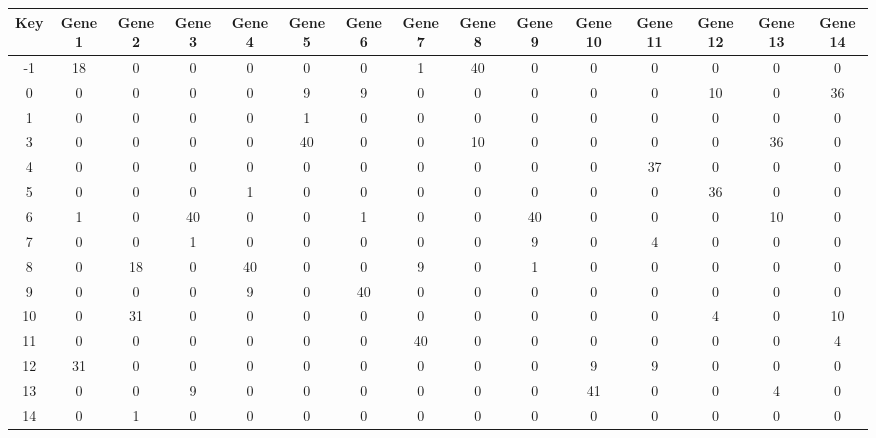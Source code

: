 \begin{tabular}{|c|c|c|c|c|c|c|c|c|c|c|c|c|c|c|}
\hline
Key & Gene 1 & Gene 2 & Gene 3 & Gene 4 & Gene 5 & Gene 6 & Gene 7 & Gene 8 & Gene 9 & Gene 10 & Gene 11 & Gene 12 & Gene 13 & Gene 14 \\
\hline
-1 & 18 & 0 & 0 & 0 & 0 & 0 & 1 & 40 & 0 & 0 & 0 & 0 & 0 & 0 \\
0 & 0 & 0 & 0 & 0 & 9 & 9 & 0 & 0 & 0 & 0 & 0 & 10 & 0 & 36 \\
1 & 0 & 0 & 0 & 0 & 1 & 0 & 0 & 0 & 0 & 0 & 0 & 0 & 0 & 0 \\
3 & 0 & 0 & 0 & 0 & 40 & 0 & 0 & 10 & 0 & 0 & 0 & 0 & 36 & 0 \\
4 & 0 & 0 & 0 & 0 & 0 & 0 & 0 & 0 & 0 & 0 & 37 & 0 & 0 & 0 \\
5 & 0 & 0 & 0 & 1 & 0 & 0 & 0 & 0 & 0 & 0 & 0 & 36 & 0 & 0 \\
6 & 1 & 0 & 40 & 0 & 0 & 1 & 0 & 0 & 40 & 0 & 0 & 0 & 10 & 0 \\
7 & 0 & 0 & 1 & 0 & 0 & 0 & 0 & 0 & 9 & 0 & 4 & 0 & 0 & 0 \\
8 & 0 & 18 & 0 & 40 & 0 & 0 & 9 & 0 & 1 & 0 & 0 & 0 & 0 & 0 \\
9 & 0 & 0 & 0 & 9 & 0 & 40 & 0 & 0 & 0 & 0 & 0 & 0 & 0 & 0 \\
10 & 0 & 31 & 0 & 0 & 0 & 0 & 0 & 0 & 0 & 0 & 0 & 4 & 0 & 10 \\
11 & 0 & 0 & 0 & 0 & 0 & 0 & 40 & 0 & 0 & 0 & 0 & 0 & 0 & 4 \\
12 & 31 & 0 & 0 & 0 & 0 & 0 & 0 & 0 & 0 & 9 & 9 & 0 & 0 & 0 \\
13 & 0 & 0 & 9 & 0 & 0 & 0 & 0 & 0 & 0 & 41 & 0 & 0 & 4 & 0 \\
14 & 0 & 1 & 0 & 0 & 0 & 0 & 0 & 0 & 0 & 0 & 0 & 0 & 0 & 0 \\
\hline
\end{tabular}